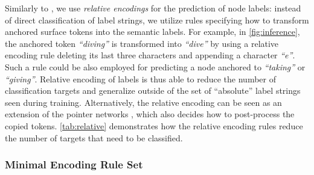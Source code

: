 \documentclass[11pt,a4paper]{article}
\newcommand{\secref}[1]{\hyperref[#1]{Section \ref*{#1}}}
\begin{document}
Similarly to \citet{straka2019udpipe,Str:Str:19}, we use \emph{relative encodings} for the prediction of node labels: instead of direct classification of label strings, we utilize rules specifying how to transform anchored surface tokens into the semantic labels. For example, in \autoref{fig:inference}, the anchored token \emph{``diving''} is transformed into \emph{``dive''} by using a relative encoding rule deleting its last three characters and appending a character \emph{``e''}. Such a rule could be also employed for predicting a node anchored to \emph{``taking''} or \emph{``giving''}. Relative encoding of labels is thus able to reduce the number of classification targets and generalize outside of the set of ``absolute'' label strings seen during training. Alternatively, the relative encoding can be seen as an extension of the pointer networks \cite{gu2016incorporating}, which also decides how to post-process the copied tokens. \autoref{tab:relative} demonstrates how the relative encoding rules reduce the number of targets that need to be classified.

\subsubsection{Minimal Encoding Rule Set}
\label{sec:min_encoding}

\begin{table}
\centering
{}

\caption{The numbers of absolutely and relatively encoded node labels. Relative encodings lead to a significant reduction of classification targets in an order of magnitude across all frameworks. Note that node labels are the union of labels and property values (except for PTG), as described in \secref{sec:representation}.}
\label{tab:relative}
\end{table}
\end{document}
